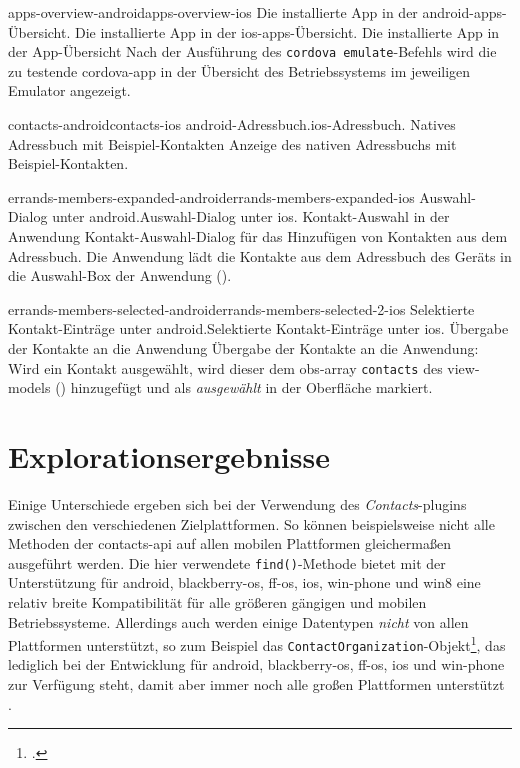 	
	\pagebreak
	
	{apps-overview-android}{apps-overview-ios}
	{Die installierte App in der \gls{android}-\glspl{app}-Übersicht.}
	{Die installierte App in der \gls{ios}-\glspl{app}-Übersicht.}
	{Die installierte App in der App-Übersicht}
	{Nach der Ausführung des \lstinline|cordova emulate|-Befehls wird die zu testende \gls{cordova}-\gls{app} in der Übersicht des Betriebssystems im jeweiligen Emulator angezeigt.}
	{\ownScreenshot}
	
	{contacts-android}{contacts-ios}
	{\gls{android}-Adressbuch.}{\gls{ios}-Adressbuch.}
	{Natives Adressbuch mit Beispiel-Kontakten}
	{Anzeige des nativen Adressbuchs mit Beispiel-Kontakten.}
	{\ownScreenshot}
	
	{errands-members-expanded-android}{errands-members-expanded-ios}
	{Auswahl-Dialog unter \gls{android}.}{Auswahl-Dialog unter \gls{ios}.}
	{Kontakt-Auswahl in der Anwendung}
	{Kontakt-Auswahl-Dialog für das Hinzufügen von Kontakten aus dem Adressbuch. Die Anwendung lädt die Kontakte aus dem Adressbuch des Geräts in die Auswahl-Box der Anwendung ().}
	{\ownScreenshot}
	
	{errands-members-selected-android}{errands-members-selected-2-ios}
	{Selektierte Kontakt-Einträge unter \gls{android}.}{Selektierte Kontakt-Einträge unter \gls{ios}.}
	{Übergabe der Kontakte an die Anwendung}
	{Übergabe der Kontakte an die Anwendung: Wird ein Kontakt ausgewählt, wird dieser dem \gls{obs}-\gls{array} \lstinline|contacts| des \glspl{view-model} () hinzugefügt und als \emph{ausgewählt} in der Oberfläche markiert.}
	{\ownScreenshot}
	
	\pagebreak
	
\section{Explorationsergebnisse} \label{sec:contacts-ergebnis}
Einige Unterschiede ergeben sich bei der Verwendung des \emph{Contacts}-\glspl{plugin} zwischen den verschiedenen Zielplattformen.
So können beispielsweise nicht alle Methoden der \gls{contacts-api} auf allen mobilen Plattformen gleichermaßen ausgeführt werden.
Die hier verwendete \lstinline|find()|-Methode bietet mit der Unterstützung für \gls{android}, \gls{blackberry-os}, \gls{ff-os}, \gls{ios}, \gls{win-phone} und \gls{win8} eine relativ  breite Kompatibilität für alle größeren gängigen und mobilen Betriebssysteme.
Allerdings auch werden einige Datentypen \emph{nicht} von allen Plattformen unterstützt, so zum Beispiel das \lstinline|ContactOrganization|-Objekt\footnote{.}, das lediglich bei der Entwicklung für \gls{android}, \gls{blackberry-os}, \gls{ff-os}, \gls{ios} und \gls{win-phone} zur Verfügung steht, damit aber immer noch alle großen Plattformen unterstützt \cite{Cordova_Plugin_Registry_Contacts}.


